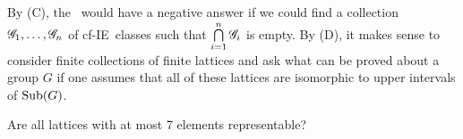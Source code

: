 \documentclass[xcolor=dvipsnames,11pt,hide notes]{beamer}
\newcommand{\IE}{{\small IE}}
\theoremstyle{definition}
\theoremstyle{remark}
\numberwithin{theorem}{section}
\numberwithin{claim}{section}
\numberwithin{equation}{section}
\numberwithin{conjecture}{section}
\begin{document}
\begin{frame}[fragile,label=Parachutes]{}
By (C), the \FLRP\ would have a negative answer if we
could find a collection $\mathscr{G}_1, \dots, \mathscr{G}_n$ of cf-\IE\ classes
such that $\bigcap\limits_{i=1}^n \mathscr{G}_i$ is empty.
\vskip6mm
By (D), it makes sense to consider finite collections of finite lattices and ask
what can be proved about a group $G$ if one assumes that all of these lattices are
isomorphic to upper intervals of $\mathrm{Sub}(G)$. 
\end{frame}






\begin{frame}[label=Sevens,shrink=7]{
    Are all lattices with at most 7 elements representable?}
  \begin{columns}
    \begin{column}{0.2\textwidth}
      \begin{center}
      \end{center}
    \end{column}
    \begin{column}{0.2\textwidth}
      \begin{center}
      \end{center}
    \end{column}
  \end{columns}
\vskip-10pt
  \begin{columns}
    \begin{column}{0.2\textwidth}

\end{column}
\end{columns}
\end{frame}
\end{document}
